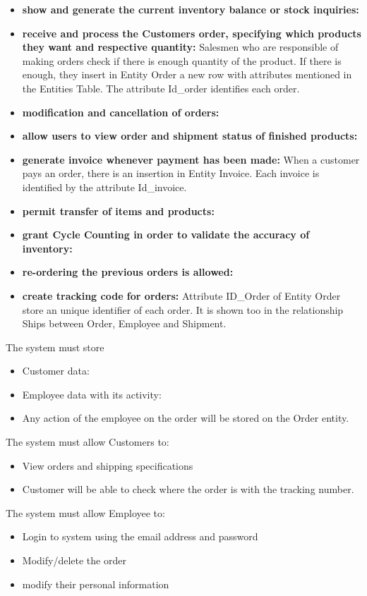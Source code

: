 \begin{itemize}
    \item \textbf{show and generate the current inventory balance or stock inquiries:}
    \item \textbf{receive and process the Customers order, specifying which products they want and respective quantity:} Salesmen who are responsible of making orders check if there is enough quantity of the product. If there is enough, they insert in Entity Order a new row with attributes mentioned in the Entities Table. The attribute Id\_order identifies each order.
    \item \textbf{modification and cancellation of orders:}
    \item \textbf{allow users to view order and shipment status of finished products:}
    \item \textbf{generate invoice whenever payment has been made:} When a customer pays an order, there is an insertion in  Entity Invoice. Each invoice is identified by the attribute Id\_invoice.
    \item \textbf{permit transfer of items and products:}
    \item \textbf{grant Cycle Counting in order to validate the accuracy of inventory:}
    \item \textbf{re-ordering the previous orders is allowed:}
    \item \textbf{create tracking code for orders:} Attribute ID\_Order of Entity Order store an unique identifier of each order. It is shown too in the relationship Ships between Order, Employee and Shipment.
\end{itemize}




The system must store
\begin{itemize}
	\item Customer data:
\end{itemize}
\begin{itemize}
	\item Employee data with its activity:
	\item Any action of the employee on the order will be stored on the Order entity.
\end{itemize}

The system must allow Customers to:
\begin{itemize}
	\item View orders and shipping specifications
	\item Customer will be able to check where the order is with the tracking number.
\end{itemize}

The system must allow Employee to:
\begin{itemize}
	\item Login to system using the email address and password
	\item Modify/delete the order
	\item modify their personal information
\end{itemize}